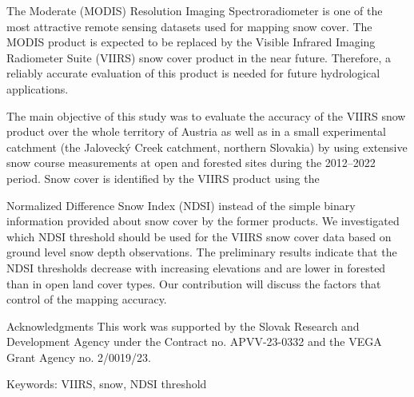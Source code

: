 \noindent

The Moderate (MODIS) Resolution Imaging Spectroradiometer is one of the most attractive remote
sensing datasets used for mapping snow cover. The MODIS product is expected to be replaced by
the Visible Infrared Imaging Radiometer Suite (VIIRS) snow cover product in the near future.
Therefore, a reliably accurate evaluation of this product is needed for future hydrological
applications.

The main objective of this study was to evaluate the accuracy of the VIIRS snow product over the
whole territory of Austria as well as in a small experimental catchment (the Jalovecký Creek
catchment, northern Slovakia) by using extensive snow course measurements at open and forested
sites during the 2012–2022 period. Snow cover is identified by the VIIRS product using the

Normalized Difference Snow Index (NDSI) instead of the simple binary information provided about
snow cover by the former products. We investigated which NDSI threshold should be used for the
VIIRS snow cover data based on ground level snow depth observations. The preliminary results
indicate that the NDSI thresholds decrease with increasing elevations and are lower in forested than
in open land cover types. Our contribution will discuss the factors that control of the mapping
accuracy.

Acknowledgments
This work was supported by the Slovak Research and Development Agency under the Contract no.
APVV-23-0332 and the VEGA Grant Agency no. 2/0019/23.

Keywords: VIIRS, snow, NDSI threshold
\newpage{}
{}
\begin{flushleft}





\end{flushleft}

